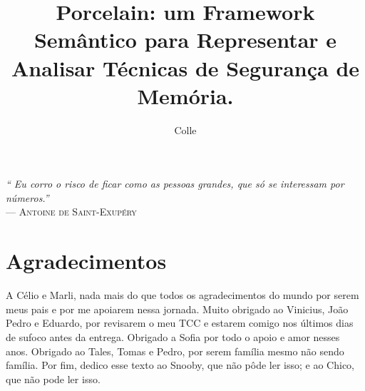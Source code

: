 \documentclass[cic,tc]{iiufrgs}
\title{Porcelain: um Framework Semântico para Representar e Analisar Técnicas de Segurança de Memória.}
\author{Colle}{Pedro Henrique Boniatti}
\begin{document}


\maketitle

 \clearpage
 \begin{flushright}
     \mbox{}\vfill
     {\sffamily\itshape
       ``
       Eu corro o risco de ficar como as pessoas grandes, 
	   que só se interessam por números.''\\
     }
     --- \textsc{Antoine de Saint-Exupéry}
 \end{flushright}

\chapter*{Agradecimentos}
A Célio e Marli, nada mais do que todos os agradecimentos 
do mundo por serem meus pais e por me apoiarem nessa jornada. Muito obrigado ao Vinicius, João Pedro e Eduardo, por revisarem o meu TCC e estarem comigo nos últimos dias de sufoco antes da entrega. Obrigado a Sofia por todo o apoio e amor nesses anos. Obrigado ao Tales, Tomas e Pedro, por serem família mesmo não sendo família. Por fim, dedico esse texto ao Snooby, que não pôde ler isso; e ao Chico, que não pode ler isso.
\end{document}
